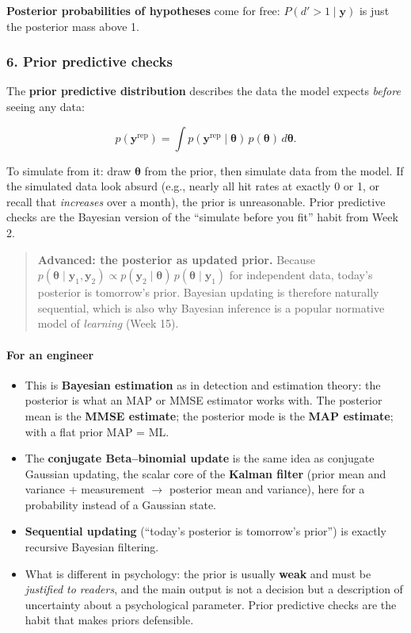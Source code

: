 \textbf{Posterior probabilities of hypotheses} come for free:
\(P(d' > 1 \mid \mathbf{y})\) is just the posterior mass above 1.

\subsubsection{6. Prior predictive checks}

The \textbf{prior predictive distribution} describes the data the model
expects \emph{before} seeing any data:

\[
p(\mathbf{y}^{\text{rep}}) = \int p(\mathbf{y}^{\text{rep}}\mid\boldsymbol\theta)\, p(\boldsymbol\theta)\, d\boldsymbol\theta.
\]

To simulate from it: draw \(\boldsymbol\theta\) from the prior, then
simulate data from the model. If the simulated data look absurd (e.g.,
nearly all hit rates at exactly 0 or 1, or recall that \emph{increases}
over a month), the prior is unreasonable. Prior predictive checks are
the Bayesian version of the ``simulate before you fit'' habit from Week
2.

\begin{quote}
\textbf{Advanced: the posterior as updated prior.} Because
\(p(\boldsymbol\theta\mid\mathbf{y}_1, \mathbf{y}_2) \propto p(\mathbf{y}_2\mid\boldsymbol\theta)\, p(\boldsymbol\theta\mid\mathbf{y}_1)\)
for independent data, today's posterior is tomorrow's prior. Bayesian
updating is therefore naturally sequential, which is also why Bayesian
inference is a popular normative model of \emph{learning} (Week 15).
\end{quote}

\paragraph{For an engineer}

\begin{itemize}
\tightlist
\item
  This is \textbf{Bayesian estimation} as in detection and estimation
  theory: the posterior is what an MAP or MMSE estimator works with. The
  posterior mean is the \textbf{MMSE estimate}; the posterior mode is
  the \textbf{MAP estimate}; with a flat prior MAP = ML.
\item
  The \textbf{conjugate Beta--binomial update} is the same idea as
  conjugate Gaussian updating, the scalar core of the \textbf{Kalman
  filter} (prior mean and variance + measurement \ensuremath{\rightarrow} posterior mean and
  variance), here for a probability instead of a Gaussian state.
\item
  \textbf{Sequential updating} (``today's posterior is tomorrow's
  prior'') is exactly recursive Bayesian filtering.
\item
  What is different in psychology: the prior is usually \textbf{weak}
  and must be \emph{justified to readers}, and the main output is not a
  decision but a description of uncertainty about a psychological
  parameter. Prior predictive checks are the habit that makes priors
  defensible.
\end{itemize}

